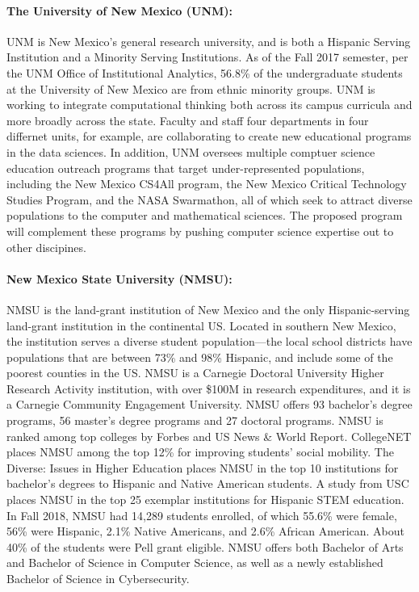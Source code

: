 \paragraph{The University of New Mexico (UNM):}
UNM is New Mexico's general research university, and is both a Hispanic Serving Institution and a Minority Serving Institutions. As of the Fall 2017 semester, per the UNM Office of Institutional Analytics, 56.8\% of the undergraduate students at the University of New Mexico are from ethnic minority groups. UNM is working to integrate computational thinking both across its campus curricula and more broadly across the state. Faculty and staff four departments in four differnet units, for example, are collaborating to create new educational programs in the data sciences. In addition, UNM oversees multiple comptuer science education outreach programs that target under-represented populations, including  the New Mexico CS4All program, the New Mexico Critical Technology Studies Program, and the NASA Swarmathon, all of which seek to attract diverse populations to the computer and mathematical sciences. The proposed program will complement these programs by pushing computer science expertise out to other discipines. 

\paragraph{New Mexico State University (NMSU):}
NMSU is the land-grant institution of New Mexico and the only Hispanic-serving land-grant institution in the continental US. Located in southern New Mexico, the institution serves a diverse student population---the local school districts have populations that are between 73\% and 98\% Hispanic, and include some of
the poorest counties in the US. NMSU is a Carnegie Doctoral University Higher Research Activity institution, with over \$100M in research expenditures, and it is a Carnegie Community Engagement University. NMSU offers 93 bachelor's degree programs, 56 master's degree programs and 27 doctoral programs. NMSU is ranked among top colleges by Forbes and US News \& World Report. CollegeNET places NMSU among the top 12\% for improving students’ social mobility. The Diverse: Issues in Higher Education places NMSU
in the top 10 institutions for bachelor’s degrees to Hispanic and Native American students. A study from USC places NMSU in the top 25 exemplar institutions for Hispanic STEM education.
In Fall 2018, NMSU had 14,289 students enrolled, of which 55.6\% were female, 56\% were Hispanic, 2.1\%
Native Americans, and 2.6\% African American. About 40\% of the students were Pell grant eligible.
NMSU offers both Bachelor of Arts and Bachelor of Science in Computer Science, as well as a newly established Bachelor of Science in Cybersecurity.  

